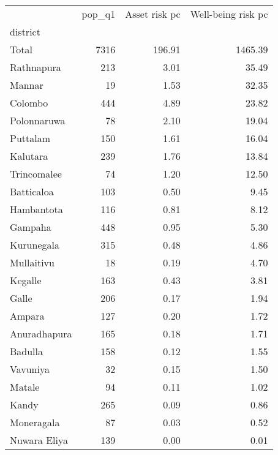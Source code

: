 \begin{tabular}{lrrr}
\toprule
{} &  pop\_q1 &  Asset risk pc &  Well-being risk pc \\
district     &         &                &                     \\
\midrule
Total        &    7316 &         196.91 &             1465.39 \\
Rathnapura   &     213 &           3.01 &               35.49 \\
Mannar       &      19 &           1.53 &               32.35 \\
Colombo      &     444 &           4.89 &               23.82 \\
Polonnaruwa  &      78 &           2.10 &               19.04 \\
Puttalam     &     150 &           1.61 &               16.04 \\
Kalutara     &     239 &           1.76 &               13.84 \\
Trincomalee  &      74 &           1.20 &               12.50 \\
Batticaloa   &     103 &           0.50 &                9.45 \\
Hambantota   &     116 &           0.81 &                8.12 \\
Gampaha      &     448 &           0.95 &                5.30 \\
Kurunegala   &     315 &           0.48 &                4.86 \\
Mullaitivu   &      18 &           0.19 &                4.70 \\
Kegalle      &     163 &           0.43 &                3.81 \\
Galle        &     206 &           0.17 &                1.94 \\
Ampara       &     127 &           0.20 &                1.72 \\
Anuradhapura &     165 &           0.18 &                1.71 \\
Badulla      &     158 &           0.12 &                1.55 \\
Vavuniya     &      32 &           0.15 &                1.50 \\
Matale       &      94 &           0.11 &                1.02 \\
Kandy        &     265 &           0.09 &                0.86 \\
Moneragala   &      87 &           0.03 &                0.52 \\
Nuwara Eliya &     139 &           0.00 &                0.01 \\
\bottomrule
\end{tabular}
